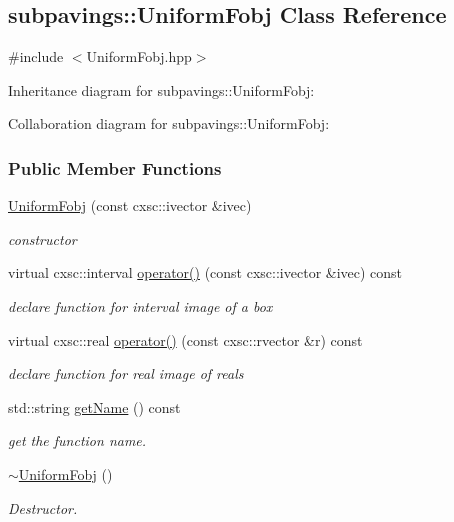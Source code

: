 \hypertarget{classsubpavings_1_1UniformFobj}{\subsection{subpavings\-:\-:\-Uniform\-Fobj \-Class \-Reference}
\label{classsubpavings_1_1UniformFobj}
}


{\ttfamily \#include $<$\-Uniform\-Fobj.\-hpp$>$}



\-Inheritance diagram for subpavings\-:\-:\-Uniform\-Fobj\-:


\-Collaboration diagram for subpavings\-:\-:\-Uniform\-Fobj\-:
\subsubsection*{\-Public \-Member \-Functions}
\begin{DoxyCompactItemize}
\item 
\hyperlink{classsubpavings_1_1UniformFobj_a14ee239616478202d0787cbc92e26dd8}{\-Uniform\-Fobj} (const cxsc\-::ivector \&ivec)
\begin{DoxyCompactList}\small\item\em constructor \end{DoxyCompactList}\item 
virtual cxsc\-::interval \hyperlink{classsubpavings_1_1UniformFobj_a109f9345700d9ddc134e06051ae41d3e}{operator()} (const cxsc\-::ivector \&ivec) const 
\begin{DoxyCompactList}\small\item\em declare function for interval image of a box \end{DoxyCompactList}\item 
virtual cxsc\-::real \hyperlink{classsubpavings_1_1UniformFobj_a61875542e031ba76f2fe680ad690fc63}{operator()} (const cxsc\-::rvector \&r) const 
\begin{DoxyCompactList}\small\item\em declare function for real image of reals \end{DoxyCompactList}\item 
std\-::string \hyperlink{classsubpavings_1_1UniformFobj_ad6329a3137c929e7089b9235934e885a}{get\-Name} () const 
\begin{DoxyCompactList}\small\item\em get the function name. \end{DoxyCompactList}\item 
\hyperlink{classsubpavings_1_1UniformFobj_a98f1449ee0a0fa6ca353dc19ed42a9af}{$\sim$\-Uniform\-Fobj} ()
\begin{DoxyCompactList}\small\item\em \-Destructor. \end{DoxyCompactList}\end{DoxyCompactItemize}
